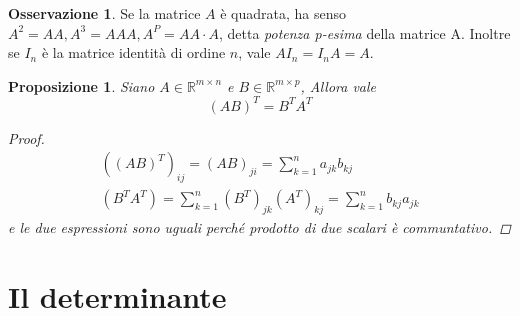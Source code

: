 \documentclass{book}
\theoremstyle{definition}
\newtheorem{oss}{Osservazione}[section]
\theoremstyle{plain}
\newtheorem{prop}{Proposizione}[section]
\begin{document}
\begin{oss}
  \label{oss:prodmtxrigcol3}
  Se la matrice $A$ è quadrata, ha senso $A^2=AA, A^3=AAA, A^P=AA\cdot{}A$, detta
  \textit{potenza p-esima} della matrice A. Inoltre se $I_n$ è la matrice identità di
  ordine $n$, vale $AI_n=I_nA=A$.
\end{oss}
\begin{prop}
  \label{prop:prodmtxrigcol1}
  Siano $A\in\mathds{R}^{m\times n}$ e $B\in \mathds{R}^{m\times p}$, Allora vale
  \begin{equation*}
    (AB)^T=B^TA^T
  \end{equation*}
  \begin{proof}
    \begin{eqnarray*}
      ((AB)^T)_{ij}=(AB)_{ji}=\sum_{k=1}^na_{jk}b_{kj}\\
      (B^TA^T)=\sum_{k=1}^n(B^T)_{jk} (A^T)_{kj}=\sum_{k=1}^nb_{kj}a_{jk}
    \end{eqnarray*}
    e le due espressioni sono uguali perché prodotto di due scalari è communtativo.
  \end{proof}
\end{prop}

\section{Il determinante}
\label{sec:determinante}
\end{document}
